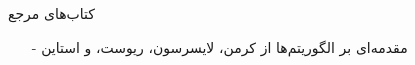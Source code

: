 \begin{frame}{کتاب‌های مرجع}
	\begin{itemize}\itmsep{5mm}
		\item[-]
		مقدمه‌ای بر الگوریتم‌ها از کرمن، لایسرسون، ریوست، و استاین
	\end{itemize}
\end{frame}


